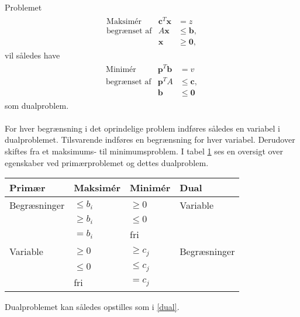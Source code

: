 %
Problemet
%
\begin{align*}
\begin{array}{lrl}
\text{Maksimér}		&\textbf{c}^T\textbf{x}	& = z		\\
\text{begrænset af}	&A\textbf{x}	&\leq \mathbf{b},	\\
					&\mathbf{x}				&\geq \mathbf{0},
\end{array}
\end{align*}
%
vil således have
%
\begin{align*}
\begin{array}{lrl}
\text{Minimér}		&\textbf{p}^T\textbf{b}	& = v			\\
\text{begrænset af}	&\textbf{p}^TA	&\leq \mathbf{c},	\\
					&\mathbf{b}				&\leq \mathbf{0}
\end{array}
\end{align*}
%
som dualproblem.
\\\\
%
For hver begrænsning i det oprindelige problem indføres således en variabel i dualproblemet.
Tilsvarende indføres en begrænsning for hver variabel. 
Derudover skiftes fra et maksimums- til minimumsproblem.
I tabel \ref{juliedum} ses en oversigt over egenskaber ved primærproblemet og dettes dualproblem.\\
%
\begin{table}[H]
\begin{center}
\begin{tabular}{llll}
Primær  & Maksimér   & Minimér    & Dual         \\
\hline
Begræsninger & $\leq b_i$ & $\geq 0$   & Variable     \\
             & $\geq b_i$ & $\leq 0$   &              \\
             & $=b_i$     & fri        &            \\ 
\hline             
Variable     & $\geq 0$   & $\geq c_j$ & Begræsninger \\
             & $\leq 0$   & $\leq c_j$ &              \\
             & fri        & $=c_j$     &  
\end{tabular}
\end{center}
\label{juliedum}
\end{table}
\noindent
%
Dualproblemet kan således opstilles som i \ref{dual}. \\

